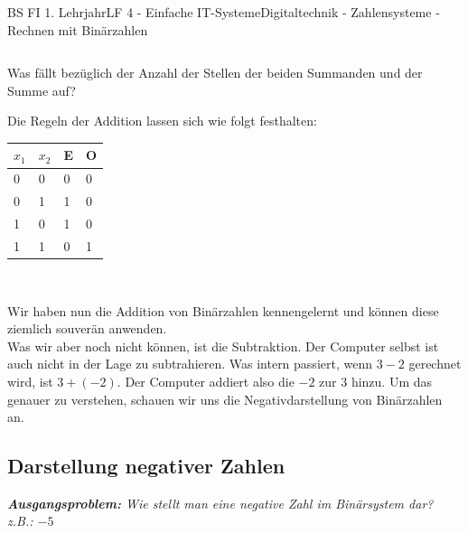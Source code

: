 \documentclass[11pt,twocolumn,oneside,openany,headings=optiontotoc,11pt,numbers=noenddot]{article}
\begin{document}
\begin{worksheet}{BS FI 1. Lehrjahr}{LF 4 - Einfache IT-Systeme}{Digitaltechnik - Zahlensysteme - Rechnen mit Binärzahlen}
\begin{framed}
\begin{tabularx}{0.4\textwidth}{llllll}
				\cline{2-6}
			\end{tabularx}
		\end{framed}
		\noindent
		Was fällt bezüglich der Anzahl der Stellen der beiden Summanden und der Summe auf?\\
		\par\noindent
		Die Regeln der Addition lassen sich wie folgt festhalten:\\
		\par\noindent
		\begin{tabularx}{0.48\textwidth}{MM|MM}
			\(x_1\) & \(x_2\) & E & O\\
			 & 0 & 0 & 0\\
			0 & 1 & 1 & 0\\
			1 & 0 & 1 & 0\\
			1 & 1 & 0 & 1\\
		\end{tabularx}\\
		\par\bigskip\noindent
		Wir haben nun die Addition von Binärzahlen kennengelernt und können diese ziemlich souverän anwenden.\\
		Was wir aber noch nicht können, ist die Subtraktion. Der Computer selbst ist auch nicht in der Lage zu subtrahieren. Was intern passiert, wenn \(3 - 2\) gerechnet wird, ist \(3 + (-2)\). Der Computer addiert also die \(-2\) zur \(3\) hinzu. Um das genauer zu verstehen, schauen wir uns die Negativdarstellung von Binärzahlen an.
		\subsection{Darstellung negativer Zahlen}
		\textit{\textbf{Ausgangsproblem:} Wie stellt man eine negative Zahl im Binärsystem dar? z.B.: \(-5\)}\\

\end{worksheet}
\end{document}
